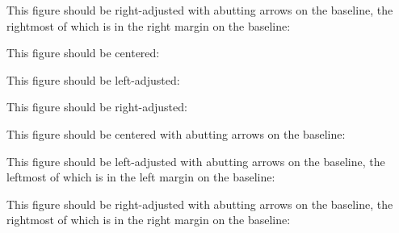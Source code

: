 This figure should be right-adjusted with abutting arrows on the
baseline, the rightmost of which is in the right margin on the
baseline:

\rightline{\ARROWPICTURE}

\noise

\vfill
\eject



\epsfframetrue
\epsfshowfalse
\epsfshowfilenametrue
\epsfverbosetrue

\noise

This figure should be centered:

\centerline{\PLAINPICTURE}

\noise

This figure should be left-adjusted:

\leftline{\PLAINPICTURE}

\noise

This figure should be right-adjusted:

\rightline{\PLAINPICTURE}

\noise

This figure should be centered with abutting arrows on the baseline:

\centerline{\ARROWPICTURE}

\noise

This figure should be left-adjusted with abutting arrows on the
baseline, the leftmost of which is in the left margin on the baseline:

\leftline{\ARROWPICTURE}

\noise

This figure should be right-adjusted with abutting arrows on the
baseline, the rightmost of which is in the right margin on the
baseline:

\rightline{\ARROWPICTURE}

\noise

\vfill
\eject


\bye

